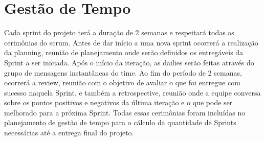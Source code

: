 \section{Gestão de Tempo}
Cada \gls{sprint} do projeto terá a duração de 2 semanas e respeitará
todas as cerimônias do \gls{scrum}. Antes de dar início a uma nova sprint
ocorrerá a realização da \gls{planning}, reunião de planejamento onde
serão definidos os entregáveis da Sprint a ser iniciada. Após o início
da iteração, as dailies serão feitas através do grupo de mensagens
instantâneas do time. Ao fim do período de 2 semanas, ocorrerá a
\gls{review}, reunião com o objetivo de avaliar o que foi entregue
com sucesso naquela Sprint, e também a \gls{retrospective}, reunião
onde a equipe conversa sobre os pontos positivos e negativos da última
iteração e o que pode ser melhorado para a próxima Sprint. Todas essas
cerimônias foram incluídas no planejamento de gestão de tempo para o
cálculo da quantidade de Sprints necessárias até a entrega final do
projeto.

